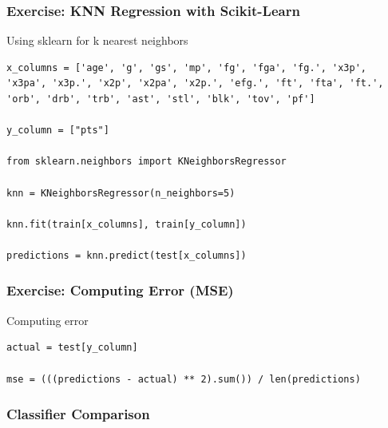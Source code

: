 \begin{frame}[fragile]\frametitle{Exercise: KNN Regression with Scikit-Learn}
Using sklearn for k nearest neighbors
\begin{lstlisting}
x_columns = ['age', 'g', 'gs', 'mp', 'fg', 'fga', 'fg.', 'x3p', 'x3pa', 'x3p.', 'x2p', 'x2pa', 'x2p.', 'efg.', 'ft', 'fta', 'ft.', 'orb', 'drb', 'trb', 'ast', 'stl', 'blk', 'tov', 'pf']

y_column = ["pts"]

from sklearn.neighbors import KNeighborsRegressor

knn = KNeighborsRegressor(n_neighbors=5)

knn.fit(train[x_columns], train[y_column])

predictions = knn.predict(test[x_columns])
\end{lstlisting}
\end{frame}

\begin{frame}[fragile]\frametitle{Exercise: Computing Error (MSE)}
Computing error
\begin{lstlisting}
actual = test[y_column]

mse = (((predictions - actual) ** 2).sum()) / len(predictions)
\end{lstlisting}
\end{frame}

\begin{frame}[fragile] \frametitle{Classifier Comparison}

\hfill
{}
\end{frame}

